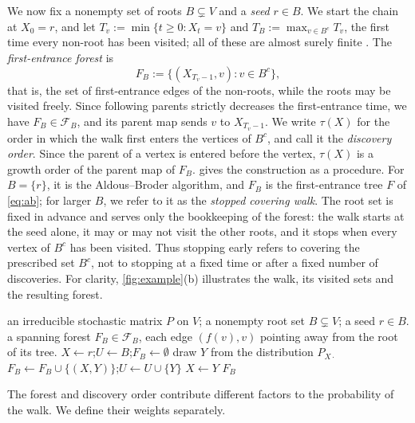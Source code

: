 \documentclass[onefignum,onetabnum]{siamart250211}
\numberwithin{theorem}{section}
\numberwithin{equation}{section}
\newcommand{\Fset}{\mathcal{F}}
\begin{document}
We now fix a nonempty set of roots $B\subsetneq V$ and
a \emph{seed} $r\in B$. We start the chain at $X_0=r$, and let
$T_v:=\min\{t\ge0:X_t=v\}$ and $T_B:=\max_{v\in B^c}T_v$, the first
time every non-root has been visited; all of these are almost surely
finite \cite[Lem.~1.13]{LevinPeres2017}. The \emph{first-entrance
forest} is
\[
F_B:=\{(X_{T_v-1},v):v\in B^c\},
\]
that is, the set of first-entrance edges of the non-roots, while the
roots may be visited freely. Since following parents strictly decreases
the first-entrance time, we have $F_B\in\Fset_B$, and its parent map
sends $v$ to $X_{T_v-1}$. We write $\tau(X)$ for the order in which the
walk first enters the vertices of $B^c$, and call it the \emph{discovery
order}. Since the parent of a vertex is entered before the vertex,
$\tau(X)$ is a growth order of the parent map of $F_B$.  gives the
construction as a procedure. For $B=\{r\}$, it is the Aldous--Broder
algorithm, and $F_B$ is the first-entrance tree $F$ of \eqref{eq:ab};
for larger $B$, we refer to it as the \emph{stopped covering walk}.
The root set is fixed in advance and serves only the bookkeeping of the
forest: the walk starts at the seed alone, it may or may not visit the
other roots, and it stops when every vertex of $B^c$ has been visited.
Thus stopping early refers to covering the prescribed set $B^c$, not to
stopping at a fixed time or after a fixed number of discoveries.
For clarity, \cref{fig:example}(b) illustrates the walk, its visited
sets and the resulting forest.
\begin{algorithm}[H]
\caption{Stopped covering walk and its first-entrance forest.}\label{alg:stopped}
\begin{algorithmic}[1]
\Require an irreducible stochastic matrix $P$ on $V$; a nonempty
root set $B\subsetneq V$; a seed $r\in B$.
\Ensure a spanning forest $F_B\in\Fset_B$, each edge $(f(v),v)$
pointing away from the root of its tree.
\State $X\gets r$;\quad $U\gets B$;\quad $F_B\gets\emptyset$
  \State draw $Y$ from the distribution $P_{X\cdot}$
    \State $F_B\gets F_B\cup\{(X,Y)\}$;\quad $U\gets U\cup\{Y\}$
  \EndIf
  \State $X\gets Y$
\EndWhile
\State \Return $F_B$
\end{algorithmic}
\end{algorithm}

The forest and discovery order contribute different factors to the
probability of the walk. We define their weights separately.
\end{document}
